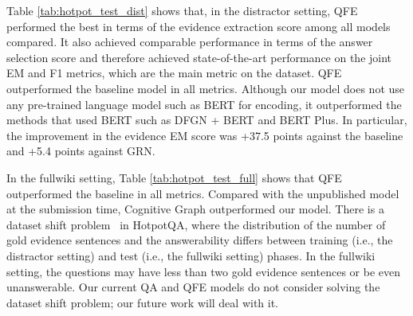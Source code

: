 \documentclass[11pt,a4paper]{article}
\theoremstyle{definition}
\begin{document}
    Table \ref{tab:hotpot_test_dist} shows that, in the distractor setting, 
    QFE performed the best in terms of the evidence extraction score among all models compared.
It also achieved comparable performance in terms of the answer selection score and therefore achieved state-of-the-art performance on the joint EM and F1 metrics, which are the main metric on the dataset.
     QFE outperformed the 
baseline model in all metrics.
    Although our model does not use any pre-trained language model such as BERT \cite{bert} for encoding, it outperformed the methods that used BERT such as DFGN + BERT and BERT Plus.
    In particular, the improvement in the evidence EM score was +37.5 points against the baseline and +5.4 points against GRN.
    
    In the fullwiki setting, Table \ref{tab:hotpot_test_full} shows that QFE outperformed the baseline
    in all metrics.
Compared with the unpublished model at the submission time, Cognitive Graph \cite{cognotive_graph} outperformed our model. 
    There is a dataset shift problem~\cite{dataset_shift} in HotpotQA, where the distribution of the number of gold evidence sentences and the answerability
    differs between training (i.e., the distractor setting) and test (i.e., the fullwiki setting) phases. In the fullwiki setting, the questions may have less than two gold evidence sentences or be even unanswerable. Our current QA and QFE models do not consider solving 
    the dataset shift problem; our future work will deal with
    it.
	
\end{document}
